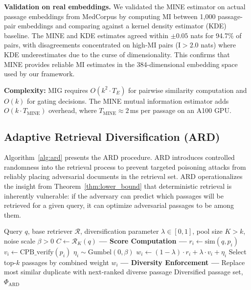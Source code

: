 \documentclass[journal,10pt]{IEEEtran}
\newcommand{\MI}{\mathrm{I}}
\newcommand{\calR}{\mathcal{R}}
\begin{document}
\textbf{Validation on real embeddings.} We validated the MINE estimator on actual passage embeddings from MedCorpus by computing MI between 1{,}000 passage-pair embeddings and comparing against a kernel density estimator (KDE) baseline. The MINE and KDE estimates agreed within $\pm 0.05$ nats for 94.7\% of pairs, with disagreements concentrated on high-MI pairs ($\MI > 2.0$ nats) where KDE underestimates due to the curse of dimensionality. This confirms that MINE provides reliable MI estimates in the 384-dimensional embedding space used by our framework.

\textbf{Complexity:} MIG requires $O(k^2 \cdot T_E)$ for pairwise similarity computation and $O(k)$ for gating decisions. The MINE mutual information estimator adds $O(k \cdot T_{\text{MINE}})$ overhead, where $T_{\text{MINE}} \approx 2$\,ms per passage on an A100 GPU.

\subsection{Adaptive Retrieval Diversification (ARD)}
Algorithm~\ref{alg:ard} presents the ARD procedure.
ARD introduces controlled randomness into the retrieval process to prevent targeted poisoning attacks from reliably placing adversarial documents in the retrieval set. ARD operationalizes the insight from Theorem~\ref{thm:lower_bound} that deterministic retrieval is inherently vulnerable: if the adversary can predict which passages will be retrieved for a given query, it can optimize adversarial passages to be among them.

\begin{algorithm}[t]
\caption{Adaptive Retrieval Diversification (ARD)}
\label{alg:ard}
\begin{algorithmic}[1]
\REQUIRE Query $q$, base retriever $\calR$, diversification parameter $\lambda \in [0,1]$, pool size $K > k$, noise scale $\beta > 0$
\STATE $C \gets \calR_K(q)$ \hfill{}
\STATE \textbf{--- Score Computation ---}
    \STATE $r_i \gets \text{sim}(q, p_i)$ \hfill{}
    \STATE $v_i \gets \text{CPB\_verify}(p_i)$ \hfill{}
    \STATE $\eta_i \sim \text{Gumbel}(0, \beta)$ \hfill{}
    \STATE $w_i \gets (1 - \lambda) \cdot r_i + \lambda \cdot v_i + \eta_i$
\ENDFOR
\STATE Select top-$k$ passages by combined weight $w_i$
\STATE \textbf{--- Diversity Enforcement ---}
    \STATE Replace most similar duplicate with next-ranked diverse passage
\ENDIF
\RETURN Diversified passage set, $\Phi_{\text{ARD}}$
\end{algorithmic}
\end{algorithm}
\end{document}
